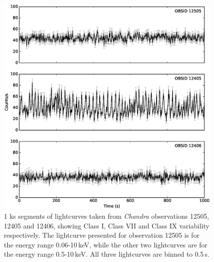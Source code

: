 \begin{figure}
    \includegraphics[width=0.8\columnwidth, trim = 0.6cm 0 3.9cm 0]{images/Chandra.eps}
    \captionsetup{singlelinecheck=off}
    \caption[\textit{Chandra} lightcurves showing examples of Class I, VII and IX variability.]{1 ks segments of lightcurves taken from \textit{Chandra} observations 12505, 12405 and 12406, showing Class I, Class VII and Class IX variability respectively.  The lightcurve presented for observation 12505 is for the energy range 0.06-10\,keV, while the other two lightcurves are for the energy range 0.5-10\,keV.  All three lightcurves are binned to 0.5\,s.}
   \label{fig:Cha_lc}
\end{figure}

